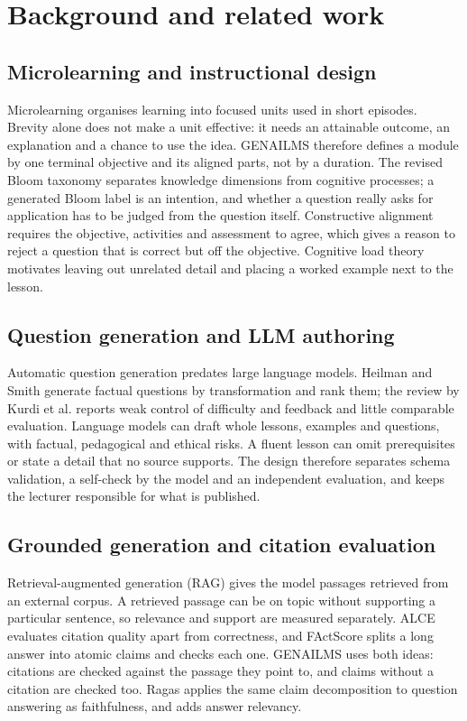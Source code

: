 \clearpage\section{Background and related work}\label{sec:background}
\subsection{Microlearning and instructional design}
Microlearning organises learning into focused units used in short episodes\citep{microlearning}. Brevity alone does not make a unit effective: it needs an attainable outcome, an explanation and a chance to use the idea. GENAILMS therefore defines a module by one terminal objective and its aligned parts, not by a duration. The revised Bloom taxonomy separates knowledge dimensions from cognitive processes\citep{bloom}; a generated Bloom label is an intention, and whether a question really asks for application has to be judged from the question itself. Constructive alignment requires the objective, activities and assessment to agree\citep{alignment}, which gives a reason to reject a question that is correct but off the objective. Cognitive load theory motivates leaving out unrelated detail and placing a worked example next to the lesson\citep{cogload}.
\subsection{Question generation and LLM authoring}
Automatic question generation predates large language models. Heilman and Smith generate factual questions by transformation and rank them\citep{heilman}; the review by Kurdi et al. reports weak control of difficulty and feedback and little comparable evaluation\citep{aqgreview}. Language models can draft whole lessons, examples and questions, with factual, pedagogical and ethical risks\citep{llmed}. A fluent lesson can omit prerequisites or state a detail that no source supports. The design therefore separates schema validation, a self-check by the model and an independent evaluation, and keeps the lecturer responsible for what is published\citep{aiedreview}.
\subsection{Grounded generation and citation evaluation}
Retrieval-augmented generation (RAG) gives the model passages retrieved from an external corpus\citep{rag}. A retrieved passage can be on topic without supporting a particular sentence, so relevance and support are measured separately. ALCE evaluates citation quality apart from correctness\citep{alce}, and FActScore splits a long answer into atomic claims and checks each one\citep{factscore}. GENAILMS uses both ideas: citations are checked against the passage they point to, and claims without a citation are checked too. Ragas applies the same claim decomposition to question answering as faithfulness, and adds answer relevancy\citep{ragas}.
